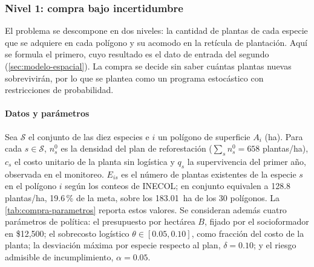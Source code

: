 \subsubsection{Nivel 1: compra bajo incertidumbre}
\label{sec:modelo-compra}

El problema se descompone en dos niveles: la cantidad de plantas de cada especie que se adquiere en cada polígono y su acomodo en la retícula de plantación. Aquí se formula el primero, cuyo resultado es el dato de entrada del segundo (\cref{sec:modelo-espacial}). La compra se decide sin saber cuántas plantas nuevas sobrevivirán, por lo que se plantea como un programa estocástico con restricciones de probabilidad.

\paragraph{Datos y parámetros}
\label{subsec:compra-parametros}

Sea $\mathcal{S}$ el conjunto de las diez especies e $i$ un polígono de superficie $A_i$ (ha). Para cada $s\in\mathcal{S}$, $n_s^0$ es la densidad del plan de reforestación ($\sum_sn_s^0=658$ plantas/ha), $c_s$ el costo unitario de la planta sin logística y $q_s$ la supervivencia del primer año, observada en el monitoreo. $E_{is}$ es el número de plantas existentes de la especie $s$ en el polígono $i$ según los conteos de INECOL; en conjunto equivalen a 128.8 plantas/ha, 19.6\,\% de la meta, sobre los 183.01~ha de los 30 polígonos. La \cref{tab:compra-parametros} reporta estos valores. Se consideran además cuatro parámetros de política: el presupuesto por hectárea $B$, fijado por el socioformador en \$12{,}500; el sobrecosto logístico $\theta\in[0.05,0.10]$, como fracción del costo de la planta; la desviación máxima por especie respecto al plan, $\delta=0.10$; y el riesgo admisible de incumplimiento, $\alpha=0.05$.

